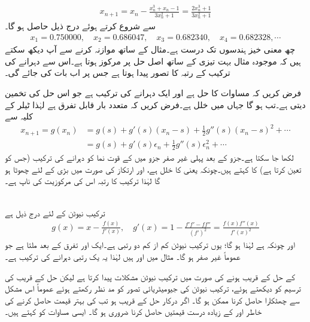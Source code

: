 \begin{align*}
x_{n+1}=x_n-\frac{x_n^3+x_n-1}{3x_n^2+1}=\frac{2x_n^3+1}{3x_n^2+1}
\end{align*}
 سے شروع کرتے ہوئے درج ذیل حاصل ہو گا۔
\begin{align*}
x_1=\num{0.750000},\quad x_2=\num{0.686047},\quad x_3=\num{0.682340},\quad x_4=\num{0.682328},\cdots
\end{align*}
 چھ معنی خیز ہندسوں تک درست ہے۔مثال  کے ساتھ موازنہ کرنے سے آپ دیکھ سکتے ہیں کہ موجودہ مثال بہت تیزی کے ساتھ اصل حل پر مرکوز ہوتا ہے۔اس سے دہرانے کی ترکیب کے رتبہ کا تصور پیدا ہوتا ہے جس پر اب بات کی جائے گی۔

فرض کریں کہ مساوات  کا حل  ہے اور   ایک دہرانے کی ترکیب ہے جو اس حل کی تخمین  دیتی ہے۔تب  ہو گا جہاں  میں خلل  ہے۔فرض کریں کہ  متعدد بار قابل تفرق ہے لہٰذا ٹیلر کے کلیہ سے 
\begin{align*}
x_{n+1}=g(x_n)&=g(s)+g'(s)(x_n-s)+\frac{1}{2}g''(s)(x_n-s)^2+\cdots\\
&=g(s)+g'(s)\epsilon_n+\frac{1}{2}g''(s)\epsilon_n^2+\cdots
\end{align*}
لکھا  جا سکتا ہے۔جزو  کے بعد پہلی غیر صفر جزو میں  کے قوت نما کو دہرانے کی ترکیب (جس کو  تعین کرتا ہے) کا  کہتے ہیں۔چونکہ  یعنی  کا خلل ہے، اور ارتکاز کی صورت میں بڑی  کے لئے  چھوٹا ہو گا لہٰذا ترکیب کا رتبہ اس کی مرکوزیت کی ناپ ہے۔

\\
ترکیب نیوٹن کے لئے درج ذیل ہے
\begin{align*} 
g(x)=x-\frac{f(x)}{f'(x)},\quad g'(x)=1-\frac{f'f'-ff''}{(f')^2}=\frac{f(x)f''(x)}{f'(x)^2}
\end{align*} 
اور چونکہ  ہے لہٰذا  ہو گا؛ یوں ترکیب نیوٹن کم از کم دو رتبی ہے۔ایک اور تفرق کے بعد  ملتا ہے جو عموماً غیر صفر ہو گا۔ مثال  میں  اور  ہیں لہٰذا یہ یک رتبی دہرانے کی ترکیب ہے۔

 کے حل کے قریب  ہونے کی صورت میں ترکیب نیوٹن مشکلات پیدا کرتا ہے لیکن حل کے قریب  کی ترسیم  کو دیکھتے ہوئے، ترکیب نیوٹن کی جیومیٹریائی تصور کو مد نظر رکھتے ہوئے عموماً  اس مشکل سے چھٹکارا حاصل کرنا ممکن ہو گا۔ اگر درکار حل کے قریب  ہو تب  کی بہتر قیمت حاصل کرنے کی خاطر   اور  کے زیادہ درست قیمتیں حاصل کرنا ضروری ہو گا۔ ایسی مساوات کو  کہتے ہیں۔

